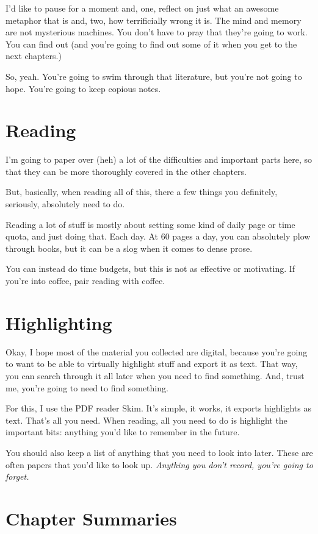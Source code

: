 I'd like to pause for a moment and, one, reflect on just what an awesome
metaphor that is and, two, how terrificially wrong it is. The mind and memory
are not mysterious machines. You don't have to pray that they're going to
work. You can find out (and you're going to find out some of it when you get to
the next chapters.)

So, yeah. You're going to swim through that literature, but you're not going to
hope. You're going to keep copious notes.

\section{Reading}

I'm going to paper over (heh) a lot of the difficulties and important parts
here, so that they can be more thoroughly covered in the other chapters.

But, basically, when reading all of this, there a few things you definitely,
seriously, absolutely need to do.

Reading a lot of stuff is mostly about setting some kind of daily page or time
quota, and just doing that. Each day. At 60 pages a day, you can absolutely plow
through books, but it can be a slog when it comes to dense prose.

You can instead do time budgets, but this is not as effective or motivating. If
you're into coffee, pair reading with coffee.

\section{Highlighting}

Okay, I hope most of the material you collected are digital, because you're
going to want to be able to virtually highlight stuff and export it as
text. That way, you can search through it all later when you need to find
something. And, trust me, you're going to need to find something.

For this, I use the PDF reader Skim. It's simple, it works, it exports
highlights as text. That's all you need. When reading, all you need to do is
highlight the important bits: anything you'd like to remember in the future.

You should also keep a list of anything that you need to look into later. These are
often papers that you'd like to look up. \textit{Anything you don't record,
  you're going to forget.}

\section{Chapter Summaries}

